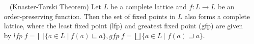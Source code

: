 %
\begin{definition}~\label{fixedpoint} (Knaster-Tarski Theorem) 
Let $L$ be a complete lattice and $f\colon L \rightarrow L$ be an
order-preserving function.  Then the set of fixed points in $L$ also forms a 
complete lattice, where the least fixed point (lfp) and greatest fixed point
(gfp) are given by $lfp\; f = \bigsqcap \{a \in L \mid f(a) \sqsubseteq a\},  
gfp\; f = \bigsqcup \{a \in L \mid f(a) \sqsupseteq a\}$. 
\end{definition}
%
  
